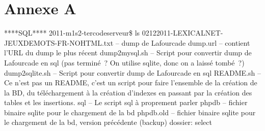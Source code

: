 \documentclass[a4paper,11pt,french]{article}
\begin{document}








\section{Annexe A}


****SQL****
2011-m1s2-ter\/code\/serveur\$ ls
02122011-LEXICALNET-JEUXDEMOTS-FR-NOHTML.txt  -- dump de Lafourcade
dump.url -- contient l'URL du dump le plus récent
dump2mysql.sh -- Script pour convertir dump de Lafourcade en sql (pas terminé~? On utilise sqlite, donc on a laissé tombé~?)
dump2sqlite.sh  -- Script pour convertir dump de Lafourcade en sql
README.sh -- Ce n'est pas un README, c'est un script pour faire l'ensemble de la création de la BD, du téléchargement à la création d'indexes en passant par la création des tables et les insertions.
sql -- Le script sql à proprement parler
php\/db -- fichier binaire sqlite pour le chargement de la bd
php\/db.old -- fichier binaire sqlite pour le chargement de la bd, version précédente (backup)
dossier: select
\end{document}
